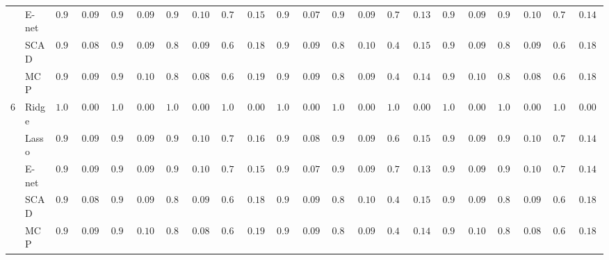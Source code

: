 \begin{tabular}{ll|ll|llllll|llllll|llllll}
 & E-net  & $0.938$ & $0.0930$ & $0.922$ & $0.0980$ & $0.908$ & $0.1002$ & $0.746$ & $0.1527$ & $0.964$ & $0.0772$ & $0.960$ & $0.0943$ & $0.710$ & $0.1374$ & $0.932$ & $0.0952$ & $0.920$ & $0.1064$ & $0.738$ & $0.1469$ \\
 & SCAD  & $0.948$ & $0.0882$ & $0.934$ & $0.0945$ & $0.876$ & $0.0976$ & $0.630$ & $0.1894$ & $0.940$ & $0.0921$ & $0.896$ & $0.1004$ & $0.498$ & $0.1544$ & $0.930$ & $0.0959$ & $0.868$ & $0.0952$ & $0.624$ & $0.1892$ \\
 & MCP  & $0.934$ & $0.0945$ & $0.908$ & $0.1002$ & $0.850$ & $0.0870$ & $0.616$ & $0.1963$ & $0.932$ & $0.0952$ & $0.872$ & $0.0965$ & $0.478$ & $0.1474$ & $0.900$ & $0.1005$ & $0.842$ & $0.0819$ & $0.630$ & $0.1894$ \\\hline
6 & Ridge  & $1.000$ & $0.0000$ & $1.000$ & $0.0000$ & $1.000$ & $0.0000$ & $1.000$ & $0.0000$ & $1.000$ & $0.0000$ & $1.000$ & $0.0000$ & $1.000$ & $0.0000$ & $1.000$ & $0.0000$ & $1.000$ & $0.0000$ & $1.000$ & $0.0000$ \\
 & Lasso  & $0.936$ & $0.0938$ & $0.926$ & $0.0970$ & $0.906$ & $0.1003$ & $0.736$ & $0.1630$ & $0.956$ & $0.0833$ & $0.954$ & $0.0979$ & $0.622$ & $0.1580$ & $0.934$ & $0.0945$ & $0.914$ & $0.1073$ & $0.716$ & $0.1454$ \\
 & E-net  & $0.938$ & $0.0930$ & $0.922$ & $0.0980$ & $0.908$ & $0.1002$ & $0.746$ & $0.1527$ & $0.964$ & $0.0772$ & $0.960$ & $0.0943$ & $0.710$ & $0.1374$ & $0.932$ & $0.0952$ & $0.920$ & $0.1064$ & $0.738$ & $0.1469$ \\
 & SCAD  & $0.948$ & $0.0882$ & $0.934$ & $0.0945$ & $0.876$ & $0.0976$ & $0.630$ & $0.1894$ & $0.940$ & $0.0921$ & $0.896$ & $0.1004$ & $0.498$ & $0.1544$ & $0.930$ & $0.0959$ & $0.868$ & $0.0952$ & $0.624$ & $0.1892$ \\
 & MCP  & $0.934$ & $0.0945$ & $0.908$ & $0.1002$ & $0.850$ & $0.0870$ & $0.616$ & $0.1963$ & $0.932$ & $0.0952$ & $0.872$ & $0.0965$ & $0.478$ & $0.1474$ & $0.900$ & $0.1005$ & $0.842$ & $0.0819$ & $0.630$ & $0.1894$ \\
\hline 
\end{tabular}

